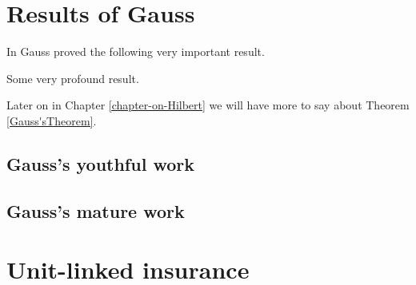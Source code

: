 \documentclass{report}
\begin{document}
\chapter{Results of Gauss}    \label{chapter-on-Gauss}

In \cite{bib:Gauss} Gauss proved the following very important result.

\begin{ttt}[Gauss]    \label{Gauss'sTheorem}
Some very profound result.
\end{ttt}


Later on in Chapter \ref{chapter-on-Hilbert}
we will have more to say about Theorem \ref{Gauss'sTheorem}.


\section{Gauss's youthful work}




\section{Gauss's mature work}













\chapter{Unit-linked insurance}     \label{unit-linked}





\end{document}
